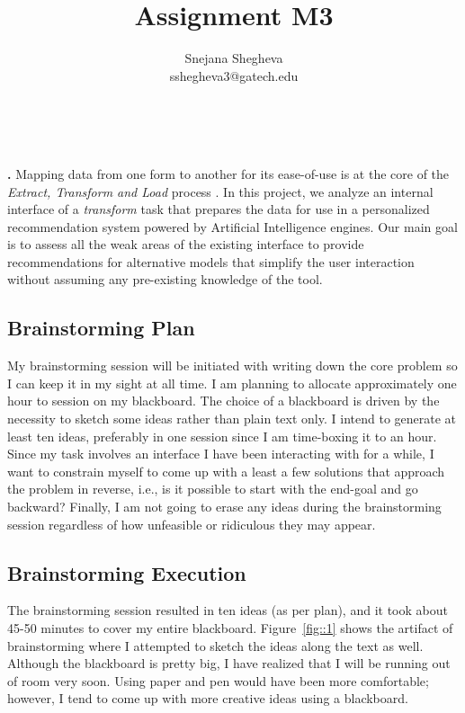 \documentclass[12pt,letterpaper]{article}
\makeatletter
\renewcommand{\maketitle}{\bgroup
   \begin{center}
   \textbf{{\fontsize{18pt}{20}\selectfont \@title}}\\
   \vspace{10pt}
   {\fontsize{12pt}{0}\selectfont \@author} 
   \end{center}
}
\newenvironment{myquote}[1]%
  {\list{}{\leftmargin=#1\rightmargin=#1}\item[]}%
  {\endlist}
\renewenvironment{abstract}
{\vspace*{-.5in}\fontsize{12pt}{12}\begin{myquote}{.5in}
\noindent \par{\bfseries \abstractname.}}
{\medskip\noindent
\end{myquote}
}
\makeatother
\begin{document}
\title{Assignment M3}
\author{Snejana Shegheva \\ sshegheva3@gatech.edu}

\maketitle
\thispagestyle{fancy}

\begin{abstract}
Mapping data from one form to another for its ease-of-use is at the core of the \textit{Extract, Transform and Load} process \cite{wiki:etl}. In this project, we analyze an internal interface of a \textit{transform} task that prepares the data for use in a personalized recommendation system powered by Artificial Intelligence engines. Our main goal is to assess all the weak areas of the existing interface to provide recommendations for alternative models that simplify the user interaction without assuming any pre-existing knowledge of the tool.
\end{abstract}

\subsection*{Brainstorming Plan}
My brainstorming session will be initiated with writing down the core problem so I can keep it in my sight at all time. I am planning to allocate approximately one hour to session on my blackboard. The choice of a blackboard is driven by the necessity to sketch some ideas rather than plain text only. I intend to generate at least ten ideas, preferably in one session since I am time-boxing it to an hour. Since my task involves an interface I have been interacting with for a while, I want to constrain myself to come up with a least a few solutions that approach the problem in reverse, i.e., is it possible to start with the end-goal and go backward? Finally, I am not going to erase any ideas during the brainstorming session regardless of how unfeasible or ridiculous they may appear. 

\subsection*{Brainstorming Execution}
The brainstorming session resulted in ten ideas (as per plan), and it took about 45-50 minutes to cover my entire blackboard. Figure~\ref{fig::1} shows the artifact of brainstorming where I attempted to sketch the ideas along the text as well. Although the blackboard is pretty big, I have realized that I will be running out of room very soon. Using paper and pen would have been more comfortable; however, I tend to come up with more creative ideas using a blackboard.
\end{document}
